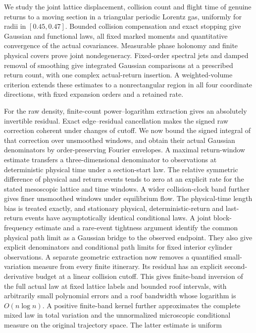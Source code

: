 
We study the joint lattice displacement, collision count and flight time
of genuine returns to a moving section in a triangular periodic Lorentz
gas, uniformly for radii in $[0.45,0.47]$. Bounded collision compensation
and exact stopping give Gaussian and functional laws, all fixed marked
moments and quantitative convergence of the actual covariances.
Measurable phase holonomy and finite physical covers prove joint
nondegeneracy. Fixed-order spectral jets and damped removal of smoothing
give integrated Gaussian comparisons at a prescribed return count,
with one complex actual-return insertion. A weighted-volume criterion
extends these estimates to a nonrectangular region in all four
coordinate directions, with fixed expansion orders and a retained rate.

For the raw density, finite-count power--logarithm extraction gives an
absolutely invertible residual. Exact edge--residual cancellation makes
the signed raw correction coherent under changes of cutoff. We now
bound the signed integral of that correction over unsmoothed windows,
and obtain their actual Gaussian denominators by order-preserving
Fourier envelopes. A maximal return-window estimate transfers a
three-dimensional denominator to observations at deterministic physical
time under a section-start law. The relative symmetric difference of
physical and return events tends to zero at an explicit rate for the
stated mesoscopic lattice and time windows. A wider collision-clock
band further gives finer unsmoothed windows under equilibrium flow.
The physical-time length bias is treated exactly, and stationary
physical, deterministic-return and last-return events have asymptotically
identical conditional laws. A joint block-frequency estimate and a
rare-event tightness argument identify the common physical path limit
as a Gaussian bridge to the observed endpoint. They also give explicit
denominators and conditional path limits for fixed interior cylinder
observations. A separate geometric extraction now removes a quantified
small-variation measure from every finite itinerary. Its residual has
an explicit second-derivative budget at a linear collision cutoff.
This gives finite-band inversion of the full actual law at fixed
lattice labels and bounded roof intervals, with arbitrarily small
polynomial errors and a roof bandwidth whose logarithm is $O(n\log n)$.
A positive finite-band kernel further approximates the complete mixed
law in total variation and the unnormalized microscopic conditional
measure on the original trajectory space. The latter estimate is uniform
